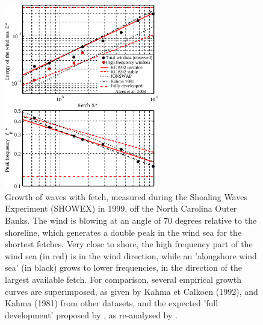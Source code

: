 \begin{figure}[htb]
\centerline{\includegraphics[width=0.6\textwidth]{FIGS_CH_FETCH/wave_growthSHOWEX_en.pdf}}
  \caption{Growth of waves with fetch, measured during  the Shoaling Waves Experiment (SHOWEX) in 1999, 
off the North Carolina Outer Banks. The wind is blowing at an angle of 70 degrees relative 
to the shoreline, which generates a double peak in the wind sea for the shortest fetches. Very close to shore, the 
high frequency part of the wind sea (in red) is in the wind direction, while an 'alongshore wind sea' (in black) grows to lower frequencies, 
in the direction of the largest available fetch. For comparison, several empirical growth curves 
are superimposed, as given by Kahma et Calkoen (1992), and Kahma (1981) from other datasets, and 
the expected 'full development' proposed by \cite{Pierson&Moskowitz1964}, as re-analysed by \cite{Alves&Banner2003}. \label{growthSHOWEX}}
\end{figure}


